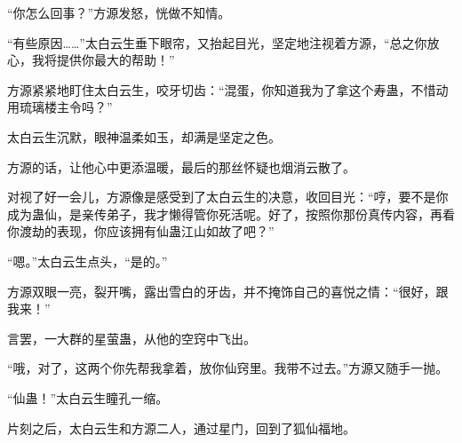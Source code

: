 \begin{this_body}
“你怎么回事？”方源发怒，恍做不知情。

“有些原因……”太白云生垂下眼帘，又抬起目光，坚定地注视着方源，“总之你放心，我将提供你最大的帮助！”

方源紧紧地盯住太白云生，咬牙切齿：“混蛋，你知道我为了拿这个寿蛊，不惜动用琉璃楼主令吗？”

太白云生沉默，眼神温柔如玉，却满是坚定之色。

方源的话，让他心中更添温暖，最后的那丝怀疑也烟消云散了。

对视了好一会儿，方源像是感受到了太白云生的决意，收回目光：“哼，要不是你成为蛊仙，是亲传弟子，我才懒得管你死活呢。好了，按照你那份真传内容，再看你渡劫的表现，你应该拥有仙蛊江山如故了吧？”

“嗯。”太白云生点头，“是的。”

方源双眼一亮，裂开嘴，露出雪白的牙齿，并不掩饰自己的喜悦之情：“很好，跟我来！”

言罢，一大群的星萤蛊，从他的空窍中飞出。

“哦，对了，这两个你先帮我拿着，放你仙窍里。我带不过去。”方源又随手一抛。

“仙蛊！”太白云生瞳孔一缩。

片刻之后，太白云生和方源二人，通过星门，回到了狐仙福地。

\end{this_body}

